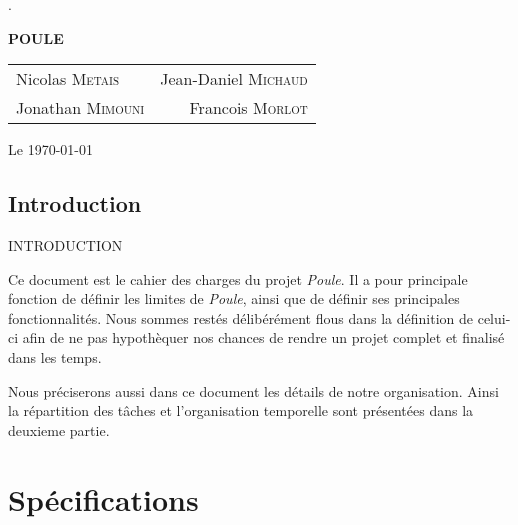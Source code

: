 \documentclass[french,12pt]{report}
\begin{document}
\sloppy

\begin{titlepage}
\begin{center}


.
\vspace{5.3cm}

\Huge \bf {POULE}

\vspace{2cm}

\large
\mdseries
\begin{tabular}{l r}
Nicolas \textsc{Metais} & Jean-Daniel \textsc{Michaud} \\
Jonathan \textsc{Mimouni} & Francois \textsc{Morlot}
\end{tabular}

\vspace{2cm}
Le \today

\end{center}
\end{titlepage}

\strut\thispagestyle{empty}
\vfill
\pagebreak
\setcounter{page}{1}
\tableofcontents
\pagebreak

\section*{Introduction}
{\uppercase{Introduction}}

Ce document  est le  cahier des charges  du projet \emph{Poule}.  Il a
pour  principale fonction  de d\'efinir  les limites  de \emph{Poule},
ainsi que de d\'efinir  ses principales fonctionnalit\'es. Nous sommes
rest\'es  d\'elib\'er\'ement flous  dans la  d\'efinition  de celui-ci
afin de ne  pas hypoth\`equer nos chances de  rendre un projet complet
et finalis\'e dans les temps.

Nous  pr\'eciserons aussi  dans  ce document  les  d\'etails de  notre
organisation.  Ainsi la r\'epartition  des t\^aches  et l'organisation
temporelle sont pr\'esent\'ees dans la deuxieme partie.

\chapter{Sp\'ecifications}
\end{document}
